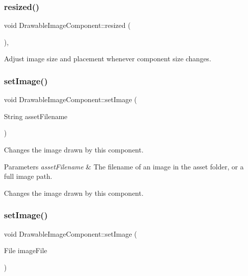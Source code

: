 \subsubsection{\texorpdfstring{resized()}{resized()}}
{\footnotesize\ttfamily void Drawable\+Image\+Component\+::resized (\begin{DoxyParamCaption}{ }\end{DoxyParamCaption})\hspace{0.3cm}{\ttfamily [override]}, {\ttfamily [protected]}}

Adjust image size and placement whenever component size changes. \mbox{\label{classDrawableImageComponent_a74bf1535fffd12dc85d42caa2f66e686}} 
\subsubsection{\texorpdfstring{set\+Image()}{setImage()}\hspace{0.1cm}{\footnotesize\ttfamily [1/4]}}
{\footnotesize\ttfamily void Drawable\+Image\+Component\+::set\+Image (\begin{DoxyParamCaption}\item[{String}]{asset\+Filename }\end{DoxyParamCaption})}

Changes the image drawn by this component.


\begin{DoxyParams}{Parameters}
{\em asset\+Filename} & The filename of an image in the asset folder, or a full image path.\\
\hline
\end{DoxyParams}
Changes the image drawn by this component. \mbox{\label{classDrawableImageComponent_a9bce5aac7018bff7be9905d43ddef7e3}} 
\subsubsection{\texorpdfstring{set\+Image()}{setImage()}\hspace{0.1cm}{\footnotesize\ttfamily [2/4]}}
{\footnotesize\ttfamily void Drawable\+Image\+Component\+::set\+Image (\begin{DoxyParamCaption}\item[{File}]{image\+File }\end{DoxyParamCaption})}

